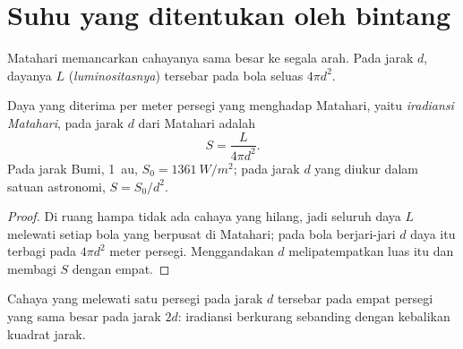 \section{Suhu yang ditentukan oleh bintang}

Matahari memancarkan cahayanya sama besar ke segala arah. Pada jarak $d$,
dayanya $L$ (\emph{luminositasnya}) tersebar pada bola seluas $4\pi d^2$.

\begin{proposition}\label{prop:g10:habitable-planet:inverse-square}
Daya yang diterima per meter persegi yang menghadap Matahari, yaitu
\emph{iradiansi Matahari}, pada jarak $d$ dari Matahari adalah
\[
  S = \frac{L}{4\pi d^2}.
\]
Pada jarak Bumi, \qty{1}{au}, $S_0 = \qty{1361}{W/m^2}$; pada jarak $d$ yang
diukur dalam satuan astronomi, $S = S_0/d^2$.
\end{proposition}

\begin{proof}
Di ruang hampa tidak ada cahaya yang hilang, jadi seluruh daya $L$ melewati
setiap bola yang berpusat di Matahari; pada bola berjari-jari $d$ daya itu
terbagi pada $4\pi d^2$ meter persegi. Menggandakan $d$ melipatempatkan luas
itu dan membagi $S$ dengan empat.
\end{proof}

\begin{omfigure}

{\small Cahaya yang melewati satu persegi pada jarak $d$ tersebar pada empat
persegi yang sama besar pada jarak $2d$: iradiansi berkurang sebanding dengan
kebalikan kuadrat jarak.}
\end{omfigure}

